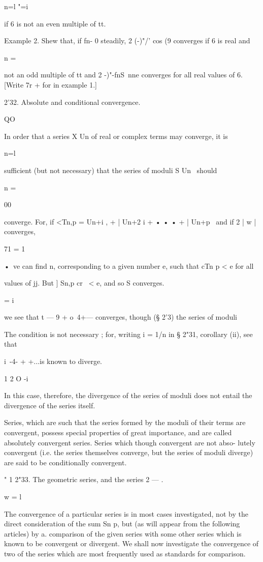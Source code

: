 n=l "=i 

if 6 is not an even multiple of tt. 

Example 2. Shew that, if fn- 0 steadily, 2 (-)"/'  cos  (9 converges if 6 is real and 

n = \ 

not an odd multiple of tt and 2  -)"-fnS\ nne converges for all real values of 6. [Write 
7r +   for   in example 1.] 

2'32. Absolute and conditional convergence. 

QO 

In order that a series X Un of real or complex terms may converge, it is 

n=l 

sufficient (but not necessary) that the series of moduli S Un \ should 

n = \ 

00 

converge. For, if <Tn,p = Un+i , + | Un+2 i + • • • + | Un+p \ and if 2 | w  | converges, 

71 = 1 

•\ ve can find n, corresponding to a given number e, such that cTn p < e for all 

values of jj. But ] Sn,p   cr \   < e, and so S    converges. 

  = i 



we see that t — 9 + o~4+--- converges, though (§ 2'3) the series of moduli 



The condition is not necessary ; for, writing  i = 1/n in § 2"31, corollary (ii), 
see that 

i\  -4- + +...is known to diverge. 

1 2 O -i 

In this case, therefore, the divergence of the series of moduli does not 
entail the divergence of the series itself. 

Series, which are such that the series formed by the moduli of their terms 
are convergent, possess special properties of great importance, and are called 
absolutely convergent series. Series which though convergent are not abso- 
lutely convergent (i.e. the series themselves converge, but the series of moduli 
diverge) are said to be conditionally convergent. 

" 1 
2"33. The geometric series, and the series 2 — . 

w = l   

The convergence of a particular series is in most cases investigated, not 
by the direct consideration of the sum Sn p, but (as will appear from the 
following articles) by a. comparison of the given series with some other series 
which is known to be convergent or divergent. We shall now investigate 
the convergence of two of the series which are most frequently used as 
standards for comparison. 



